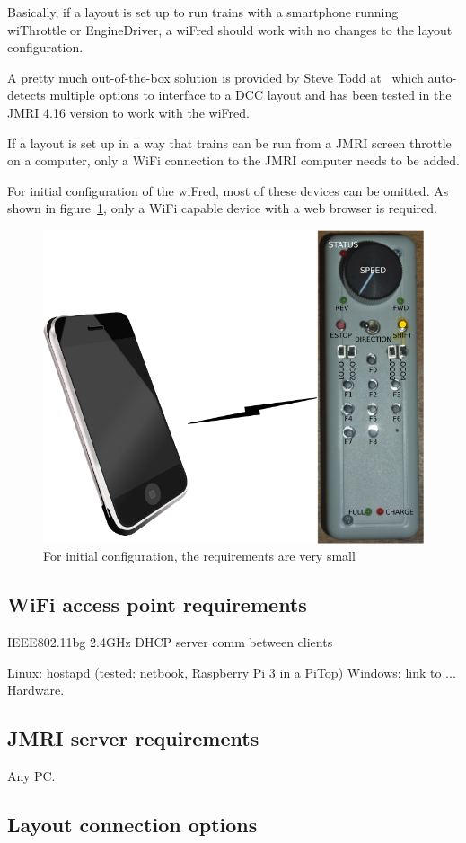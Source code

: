 \documentclass[11pt,a4paper]{scrartcl}
\begin{document}
Basically, if a layout is set up to run trains with a smartphone running wiThrottle or EngineDriver, a wiFred should work with no changes to the layout configuration.

A pretty much out-of-the-box solution is provided by Steve Todd at~\cite{raspiImage} which auto-detects multiple options to interface to a DCC layout and has been tested in the JMRI 4.16 version to work with the wiFred.

If a layout is set up in a way that trains can be run from a JMRI screen throttle on a computer, only a WiFi connection to the JMRI computer needs to be added.

For initial configuration of the wiFred, most of these devices can be omitted. As shown in figure~\ref{confWifred}, only a WiFi capable device with a web browser is required.

\begin{figure}[tbh]
  \centering
  \includegraphics[width=0.5 \textwidth]{images/configuringWifred}
  \caption{For initial configuration, the requirements are very small}
  \label{confWifred}
\end{figure}

\subsection{WiFi access point requirements} \label{serverWiFi}

IEEE802.11bg 2.4GHz DHCP server comm between clients

Linux: hostapd (tested: netbook, Raspberry Pi 3 in a PiTop)
Windows: link to ...
Hardware.

\subsection{JMRI server requirements} \label{serverJMRI}

Any PC.

\subsection{Layout connection options} \label{serverLayoutConn}
\end{document}
